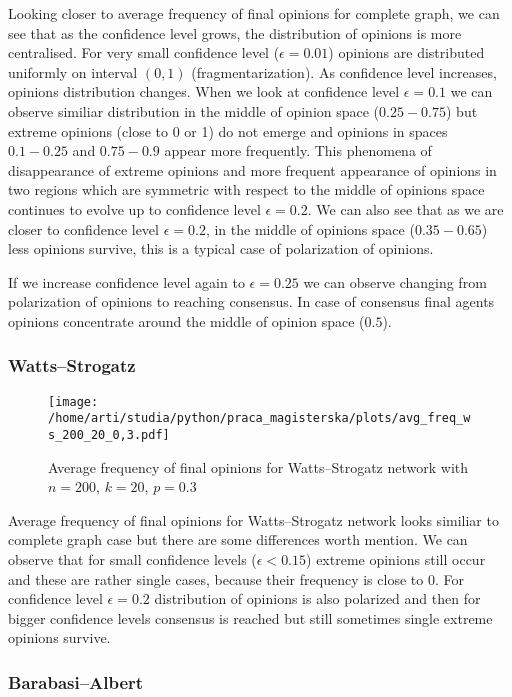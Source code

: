 \documentclass{article}
\begin{document}
Looking closer to average frequency of final opinions for complete graph, we can see that as the confidence level grows, the distribution of opinions is more centralised. For very small confidence level ($\epsilon=0.01$) opinions are distributed uniformly on interval $(0, 1)$ (fragmentarization). As confidence level increases, opinions distribution changes. When we look at confidence level $\epsilon=0.1$ we can observe similiar distribution in the middle of opinion space ($0.25-0.75$) but extreme opinions (close to 0 or 1) do not emerge and opinions in spaces $0.1-0.25$ and $0.75-0.9$ appear more frequently. This phenomena of disappearance of extreme opinions and more frequent appearance of opinions in two regions which are symmetric with respect to the middle of opinions space continues to evolve up to confidence level $\epsilon=0.2$. We can also see that as we are closer to confidence level $\epsilon=0.2$, in the middle of opinions space ($0.35-0.65$) less opinions survive, this is a typical case of polarization of opinions.
\indent

If we increase confidence level again to $\epsilon=0.25$ we can observe changing from polarization of opinions to reaching consensus. In case of consensus final agents opinions concentrate around the middle of opinion space ($0.5$).


\subsubsection{Watts--Strogatz}

\begin{figure}[H]
		\centering
		\texttt{[image: /home/arti/studia/python/praca\_magisterska/plots/avg\_freq\_ws\_200\_20\_0,3.pdf]}
		\caption{Average frequency of final opinions for Watts--Strogatz network with $n=200$, $k=20$, $p=0.3$}
\end{figure}

Average frequency of final opinions for Watts--Strogatz network looks similiar to complete graph case but there are some differences worth mention. We can observe that for small confidence levels ($\epsilon<0.15$) extreme opinions still occur and these are rather single cases, because their frequency is close to 0. For confidence level $\epsilon=0.2$ distribution of opinions is also polarized and then for bigger confidence levels consensus is reached but still sometimes single extreme opinions survive.

\subsubsection{Barabasi--Albert}
\end{document}

